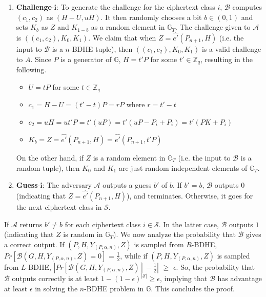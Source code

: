 \begin{enumerate}
 \item \textbf{Challenge}-$\mathbf{i}$: To generate the challenge for the ciphertext class $i$, $\mathcal{B}$ computes $(c_1,c_2)$ as $(H-U,uH)$. It then randomly chooses a bit $b\in{(0,1)}$ and sets $K_b$ as $Z$ and $K_{1-b}$ as a random element in $\mathbb{G}_T$. The challenge given to $\mathcal{A}$ is $((c_1,c_2),K_0,K_1)$.  We claim that when $Z=\hat{e'}(P_{n+1},H)$ (i.e. the input to $\mathcal{B}$ is a $n$-BDHE tuple), then $((c_1,c_2),K_0,K_1)$ is a valid challenge to $A$. Since $P$ is a generator of $\mathbb{G}$, $H=t'P$ for some $t'\in\mathbb{Z}_q$, resulting in the following.

 \begin{itemize}
  \item $U=tP$ for some $t\in\mathbb{Z}_q$
  \item $c_1=H-U=(t'-t)P=rP$ where $r=t'-t$
  \item $c_2=uH=ut'P=t'(uP)=t'(uP-{P_i}+P_i)=t'(PK+P_i)$
  \item $K_b=Z=\hat{e'}(P_{n+1},H)=\hat{e'}(P_{n+1},t'P)$
 \end{itemize}
 On the other hand, if $Z$ is a random element in $\mathbb{G}_T$ (i.e. the input to $\mathcal{B}$ is a random tuple), then $K_0$ and $K_1$ are just random independent elements of $\mathbb{G}_T$.
 
 \item\textbf{Guess}-$\mathbf{i}$: The adversary $\mathcal{A}$ outputs a guess $b'$ of $b$. If $b' = b$, $\mathcal{B}$ outputs $0$ (indicating that $Z = \hat{e'}(P_{n+1},H)$), and terminates. Otherwise, it goes for the next ciphertext class in $\mathcal{S}$.
\end{enumerate}

If $\mathcal{A}$ returns $b' \neq b$ for each ciphertext class $i\in\mathcal{S}$. In the latter case, $\mathcal{B}$ outputs $1$ (indicating that $Z$ is random in $\mathbb{G}_T$). We now analyze the probability that $\mathcal{B}$ gives a correct output. If $(P,H,Y_{(P,\alpha,n)},Z)$ is sampled from $R$-BDHE, $Pr[\mathcal{B}(G,H,Y_{(P,\alpha,n)},Z)=0]$ = $\frac{1}{2}$, while if $(P,H,Y_{(P,\alpha,n)},Z)$ is sampled from $L$-BDHE, $|Pr[\mathcal{B}(G,H,Y_{(P,\alpha,n)},Z)]-\frac{1}{2}|$ $\geq$ $\epsilon$. So, the probability that $\mathcal{B}$ outputs correctly is at least $1-(1-\epsilon)^{|\mathcal{S}|} \geq \epsilon$, implying that $\mathcal{B}$ has advantage at least $\epsilon$ in solving the $n$-BDHE problem in $\mathbb{G}$. This concludes the proof.


